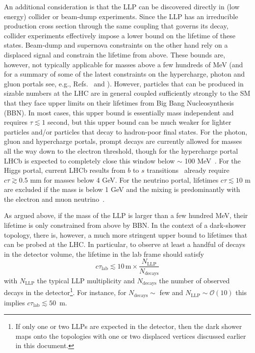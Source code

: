 An additional consideration is that the LLP can be discovered directly in (low energy) collider or beam-dump experiments. Since the LLP has an irreducible production cross section through the same coupling that governs its decay, collider experiments effectively impose a lower bound on the lifetime of these states. Beam-dump and supernova constraints on the other hand rely on a displaced signal and constrain the lifetime from above. These bounds are, however, not typically applicable for masses above a few hundreds of MeV (and for a summary of some of the latest constraints on the hypercharge, photon and gluon portals see, e.g., Refs.~\cite{Ilten:2018crw} and \cite{Bauer:2017ris}). However, particles that can be produced in sizable numbers at the LHC are in general coupled sufficiently strongly to the SM that they face upper limits on their lifetimes from Big Bang Nucleosynthesis (BBN). In most cases, this upper bound is essentially mass independent and requires $\tau\lesssim 1$ second, but this upper bound can be much weaker for lighter particles and/or particles that decay to hadron-poor final states.  For the photon, gluon and hypercharge portals, prompt decays are currently allowed for masses all the way down to the electron threshold, though for the hypercharge portal LHCb is expected to completely close this window below $\sim$ 100 MeV~\cite{Ilten:2015hya,Ilten:2016tkc}. For the Higgs  portal, current LHCb results from $b$ to $s$ transitions~\cite{Aaij:2015tna,Aaij:2016qsm} already require $c\tau \gtrsim 0.5$ mm for masses below 4 GeV. For the neutrino portal, lifetimes $c\tau\lesssim 10$ m are excluded if the mass is below 1 GeV and the mixing is predominantly with the electron and muon neutrino~\cite{Deppisch:2015qwa}.

As argued above, if the mass of the LLP is larger than a few hundred MeV, their lifetime is only constrained from above by BBN. In the context of a dark-shower topology, there is, however, a much more stringent upper bound to lifetimes that can be probed at the LHC. In particular, to observe at least a handful of decays in the detector volume, the lifetime in the lab frame should satisfy
\begin{equation}
c\tau_{\text{lab}} \lesssim 10 \,\text{m}\times \frac{N_{\text{LLP}}}{N_{\text{decays}}}
\end{equation}
with $N_{\text{LLP}}$ the typical LLP multiplicity and $N_{\text{decays}}$ the number of observed decays in the detector\footnote{If only one or two LLPs are expected in the detector, then the dark shower maps onto the topologies with one or two displaced vertices discussed earlier in this document.}. For instance, for $N_{\text{decays}}\sim$ few and $N_{\text{LLP}}\sim \mathcal{O}(10)$ this implies $c\tau_{\text{lab}}\lesssim 50$~m.

